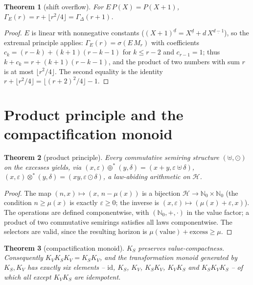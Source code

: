 \documentclass[11pt]{article}
\newtheorem{satz}{Theorem}[section]
\theoremstyle{definition}
\theoremstyle{remark}
\newcommand{\Hori}{\mathcal H}
\newcommand{\NN}{\mathbb N_0}
\newcommand{\ff}[2]{#1^{\underline{#2}}}
\newcommand{\KV}{K_V}
\newcommand{\KS}{K_S}
\begin{document}
\begin{satz}[shift overflow]
For $E\,P(X)=P(X{+}1)$,
$\Gamma_E(r)=r+\lfloor r^2/4\rfloor=\Gamma_\Delta(r{+}1)$.
\end{satz}

\begin{proof}
$E$ is linear with nonnegative constants
($\ff{(X{+}1)}d=\ff Xd+d\,\ff X{d-1}$), so the extremal principle
applies: $\Gamma_E(r)=\sigma(E\,M_r)$ with coefficients
$c_k=(r{-}k)+(k{+}1)(r{-}k{-}1)$ for $k\le r{-}2$ and $c_{r-1}=1$;
thus $k+c_k=r+(k{+}1)(r{-}k{-}1)$, and the product of two numbers
with sum $r$ is at most $\lfloor r^2/4\rfloor$. The second
equality is the identity
$r+\lfloor r^2/4\rfloor=\lfloor(r{+}2)^2/4\rfloor-1$.
\end{proof}


\section{Product principle and the compactification
monoid}\label{app:monoid}

\begin{satz}[product principle]
Every commutative semiring structure $(\uplus,\odot)$ on the
excesses yields, via
$(x,\varepsilon)\oplus^{*}(y,\delta)=(x{+}y,\varepsilon\uplus\delta)$,
$(x,\varepsilon)\otimes^{*}(y,\delta)=(xy,\varepsilon\odot\delta)$,
a law-abiding arithmetic on $\Hori$.
\end{satz}

\begin{proof}
The map $(n,x)\mapsto(x,\,n-\mu(x))$ is a bijection
$\Hori\to\NN\times\NN$ (the condition $n\ge\mu(x)$ is exactly
$\varepsilon\ge0$; the inverse is
$(x,\varepsilon)\mapsto(\mu(x){+}\varepsilon,x)$). The operations
are defined componentwise, with $(\NN,+,\cdot)$ in the value
factor; a product of two commutative semirings satisfies all laws
componentwise. The selectors are valid, since the resulting
horizon is $\mu(\text{value})+\text{excess}\ge\mu$.
\end{proof}


\begin{satz}[compactification monoid]
$\KS$ preserves value-compactness. Consequently
$\KV\KS\KV=\KS\KV$, and the transformation monoid generated by
$\KS,\KV$ has exactly six elements -- $\mathrm{id}$,
$\KS$, $\KV$, $\KS\KV$, $\KV\KS$ and $\KS\KV\KS$ -- of which
all except $\KV\KS$ are idempotent.
\end{satz}
\end{document}
